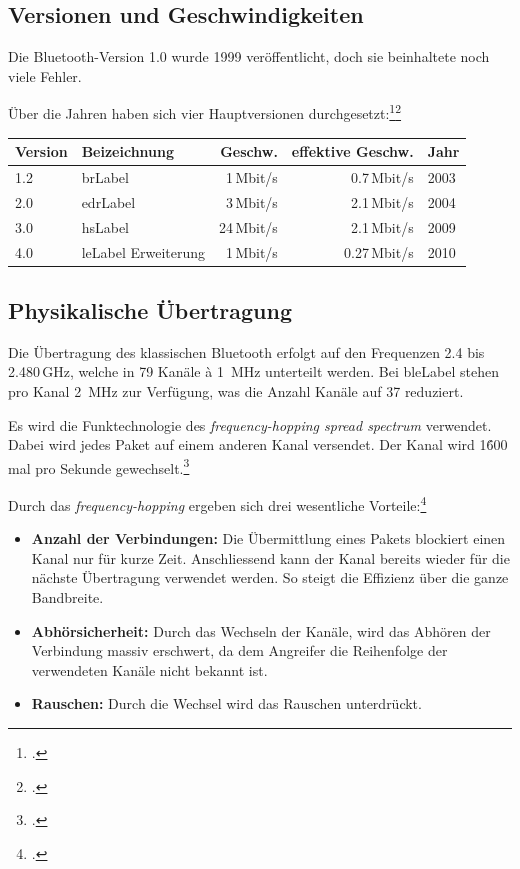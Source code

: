 \subsection{Versionen und Geschwindigkeiten}
\label{subsec:versions_speed}
Die Bluetooth-Version 1.0 wurde 1999 veröffentlicht, doch sie beinhaltete noch viele Fehler.

Über die Jahren haben sich vier Hauptversionen durchgesetzt:\footcite{Bluetooth_low_energy_Wikipedia_2015-04-17}\footcite{Our_History_Bluetooth_Technology_Website_2015-04-17}
\begin{table}[H]
\small\sffamily\renewcommand{\arraystretch}{1.4}
\begin{tabular}{llrrl}
\toprule
	Version & Beizeichnung & Geschw. & effektive Geschw.  & Jahr\\
\midrule
	1.2 & \gls{brLabel} & 1\,Mbit/s & 0.7\,Mbit/s & 2003 \\
	2.0 & \gls{edrLabel} & 3\,Mbit/s & 2.1\,Mbit/s & 2004 \\
	3.0 & \gls{hsLabel} & 24\,Mbit/s & 2.1\,Mbit/s & 2009\\
	4.0 & \gls{leLabel} Erweiterung & 1\,Mbit/s &  0.27\,Mbit/s & 2010 \\
\bottomrule
\end{tabular}
\end{table}



\subsection{Physikalische Übertragung}
Die Übertragung des klassischen Bluetooth erfolgt auf den Frequenzen 2.4 bis 2.480\,GHz, welche in 79 Kanäle à 1\, MHz unterteilt werden.
Bei \gls{bleLabel} stehen pro Kanal 2\, MHz zur Verfügung, was die Anzahl Kanäle auf 37 reduziert.

Es wird die Funktechnologie des \textit{frequency-hopping spread spectrum} verwendet.
Dabei wird jedes Paket auf einem anderen Kanal versendet.
Der Kanal wird 1\'600 mal pro Sekunde gewechselt.\footcite{Bluetooth_Wikipedia_2015-04-17}

Durch das \textit{frequency-hopping} ergeben sich drei wesentliche Vorteile:\footcite{Frequency-hopping_spread_spectrum_-_Wikipedia_2015-04-17}
\begin{itemize}
	\item \textbf{Anzahl der Verbindungen:} Die Übermittlung eines Pakets blockiert einen Kanal nur für kurze Zeit.
		Anschliessend kann der Kanal bereits wieder für die nächste Übertragung verwendet werden.
		So steigt die Effizienz über die ganze Bandbreite.
	\item \textbf{Abhörsicherheit:} Durch das Wechseln der Kanäle, wird das Abhören der Verbindung massiv erschwert, da dem Angreifer die Reihenfolge der verwendeten Kanäle nicht bekannt ist.
	\item \textbf{Rauschen:} Durch die Wechsel wird das Rauschen unterdrückt.
\end{itemize}

